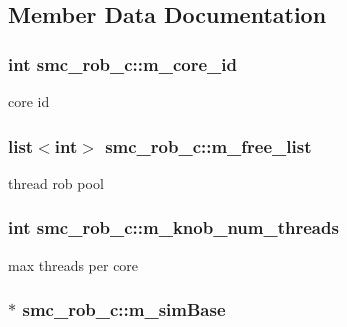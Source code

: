 \subsection{Member Data Documentation}
\hypertarget{classsmc__rob__c_aad4bb4dd7c9e789a7f5d4d035f072649}{
\subsubsection[{m\_\-core\_\-id}]{\setlength{\rightskip}{0pt plus 5cm}int {\bf smc\_\-rob\_\-c::m\_\-core\_\-id}}}
\label{classsmc__rob__c_aad4bb4dd7c9e789a7f5d4d035f072649}
core id \hypertarget{classsmc__rob__c_a9db8c324e0133f306a0401ad53a52997}{
\subsubsection[{m\_\-free\_\-list}]{\setlength{\rightskip}{0pt plus 5cm}list$<$int$>$ {\bf smc\_\-rob\_\-c::m\_\-free\_\-list}}}
\label{classsmc__rob__c_a9db8c324e0133f306a0401ad53a52997}
thread rob pool \hypertarget{classsmc__rob__c_a3fe15387db97e2865368976780a54db3}{
\subsubsection[{m\_\-knob\_\-num\_\-threads}]{\setlength{\rightskip}{0pt plus 5cm}int {\bf smc\_\-rob\_\-c::m\_\-knob\_\-num\_\-threads}}}
\label{classsmc__rob__c_a3fe15387db97e2865368976780a54db3}
max threads per core \hypertarget{classsmc__rob__c_a8f735f49a88a96ae31045a882dff660d}{
\subsubsection[{m\_\-simBase}]{$\ast$ {\bf smc\_\-rob\_\-c::m\_\-simBase}}}
